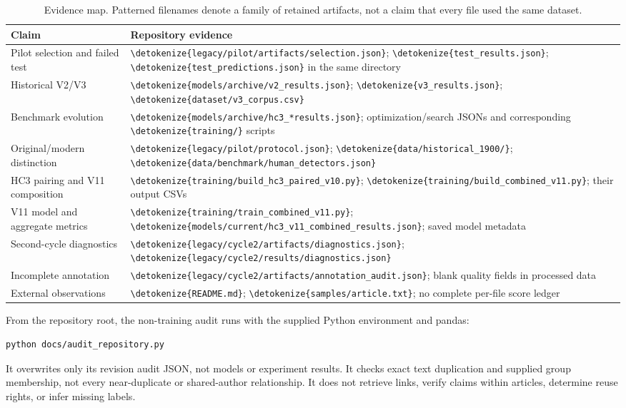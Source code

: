 \documentclass[11pt]{article}
\newcommand{\code}[1]{\expandafter\nolinkurl\expandafter{\detokenize{#1}}}
\begin{document}
\begin{table}[htbp]
\centering\small
\begin{tabularx}{\linewidth}{lX}
\toprule
Claim & Repository evidence \\
\midrule
Pilot selection and failed test & \code{legacy/pilot/artifacts/selection.json}; \code{test_results.json}; \code{test_predictions.json} in the same directory \\
Historical V2/V3 & \code{models/archive/v2_results.json}; \code{v3_results.json}; \code{dataset/v3_corpus.csv} \\
Benchmark evolution & \code{models/archive/hc3_*results.json}; optimization/search JSONs and corresponding \code{training/} scripts \\
Original/modern distinction & \code{legacy/pilot/protocol.json}; \code{data/historical_1900/}; \code{data/benchmark/human_detectors.json} \\
HC3 pairing and V11 composition & \code{training/build_hc3_paired_v10.py}; \code{training/build_combined_v11.py}; their output CSVs \\
V11 model and aggregate metrics & \code{training/train_combined_v11.py}; \code{models/current/hc3_v11_combined_results.json}; saved model metadata \\
Second-cycle diagnostics & \code{legacy/cycle2/artifacts/diagnostics.json}; \code{legacy/cycle2/results/diagnostics.json} \\
Incomplete annotation & \code{legacy/cycle2/artifacts/annotation_audit.json}; blank quality fields in processed data \\
External observations & \code{README.md}; \code{samples/article.txt}; no complete per-file score ledger \\
\bottomrule
\end{tabularx}
\caption{Evidence map. Patterned filenames denote a family of retained
artifacts, not a claim that every file used the same dataset.}
\label{tab:evidencemap}
\end{table}

From the repository root, the non-training audit runs with the supplied
Python environment and pandas:
\begin{lstlisting}
python docs/audit_repository.py
\end{lstlisting}
It overwrites only its revision audit JSON, not models or experiment results.
It checks exact text duplication and supplied group membership, not every
near-duplicate or shared-author relationship. It does not retrieve links,
verify claims within articles, determine reuse rights, or infer missing labels.
\end{document}
